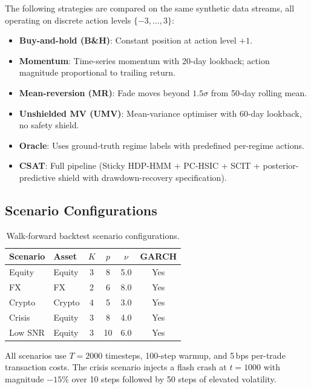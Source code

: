 \documentclass[11pt]{article}
\begin{document}
The following strategies are compared on the same synthetic data
streams, all operating on discrete action levels $\{-3,\ldots,3\}$:
\begin{itemize}[nosep]
  \item \textbf{Buy-and-hold (B\&H)}: Constant position at action
        level $+1$.
  \item \textbf{Momentum}: Time-series momentum with 20-day lookback;
        action magnitude proportional to trailing return.
  \item \textbf{Mean-reversion (MR)}: Fade moves beyond $1.5\sigma$
        from 50-day rolling mean.
  \item \textbf{Unshielded MV (UMV)}: Mean-variance optimiser with
        60-day lookback, no safety shield.
  \item \textbf{Oracle}: Uses ground-truth regime labels with
        predefined per-regime actions.
  \item \textbf{CSAT}: Full pipeline (Sticky HDP-HMM + PC-HSIC +
        SCIT + posterior-predictive shield with drawdown-recovery
        specification).
\end{itemize}

\subsection{Scenario Configurations}

\begin{table}[h]
\centering
\caption{Walk-forward backtest scenario
configurations.}\label{tab:scenarios}
\small
\begin{tabular}{@{}llcccc@{}}
\toprule
\textbf{Scenario} & \textbf{Asset} & $K$ & $p$ & $\nu$
  & \textbf{GARCH} \\
\midrule
Equity     & Equity & 3 & 8  & 5.0 & Yes \\
FX         & FX     & 2 & 6  & 8.0 & Yes \\
Crypto     & Crypto & 4 & 5  & 3.0 & Yes \\
Crisis     & Equity & 3 & 8  & 4.0 & Yes \\
Low SNR    & Equity & 3 & 10 & 6.0 & Yes \\
\bottomrule
\end{tabular}
\end{table}

All scenarios use $T{=}2000$ timesteps, 100-step warmup, and
5\,bps per-trade transaction costs.  The crisis scenario injects
a flash crash at $t{=}1000$ with magnitude $-15\%$ over 10 steps
followed by 50 steps of elevated volatility.
\end{document}
